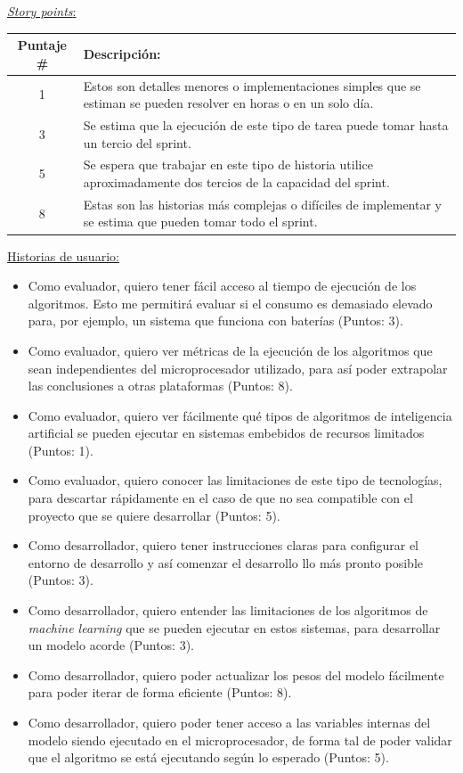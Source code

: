 \documentclass[
11pt, %
codirector, %
]{charter}
\begin{document}
\underline{\textit{Story points}:} 
\begin{table}[h]
\centering
\renewcommand{\tabularxcolumn}{m} %

\begin{tabularx}{\textwidth}{|c|>{\raggedright}X|}
\hline
\textbf{Puntaje \#} & \textbf{Descripción:} \tabularnewline
\hline
1 & Estos son detalles menores o implementaciones simples que se estiman se pueden resolver en horas o en un solo día.\tabularnewline
\hline
3 & Se estima que la ejecución de este tipo de tarea puede tomar hasta un tercio del sprint. \tabularnewline
\hline
5 & Se espera que trabajar en este tipo de historia utilice aproximadamente dos tercios de la capacidad del sprint. \tabularnewline
\hline
8 & Estas son las historias más complejas o difíciles de implementar y se estima que pueden tomar todo el sprint. \tabularnewline
\hline
\end{tabularx}
\end{table}


\underline{Historias de usuario:} 
\begin{itemize}
\item Como evaluador, quiero tener fácil acceso al tiempo de ejecución de los algoritmos. Esto me permitirá evaluar si el consumo es demasiado elevado para, por ejemplo, un sistema que funciona con baterías (Puntos: 3).
\item Como evaluador, quiero ver métricas de la ejecución de los algoritmos que sean independientes del microprocesador utilizado, para así poder extrapolar las conclusiones a otras plataformas (Puntos: 8).
\item Como evaluador, quiero ver fácilmente qué tipos de algoritmos de inteligencia artificial se pueden ejecutar en sistemas embebidos de recursos limitados  (Puntos: 1).
\item Como evaluador, quiero conocer las limitaciones de este tipo de tecnologías, para descartar rápidamente en el caso de que no sea compatible con el proyecto que se quiere desarrollar  (Puntos: 5).
\item Como desarrollador, quiero tener instrucciones claras para configurar el entorno de desarrollo y así comenzar el desarrollo llo más pronto posible  (Puntos: 3).
\item Como desarrollador, quiero entender las limitaciones de los algoritmos de \textit{machine learning} que se pueden ejecutar en estos sistemas, para desarrollar un modelo acorde (Puntos: 3).
\item Como desarrollador, quiero poder actualizar los pesos del modelo fácilmente para poder iterar de forma eficiente  (Puntos: 8).
\item Como desarrollador, quiero poder tener acceso a las variables internas del modelo siendo ejecutado en el microprocesador, de forma tal de poder validar que el algoritmo se está ejecutando según lo esperado (Puntos: 5).
\end{itemize}
\end{document}
